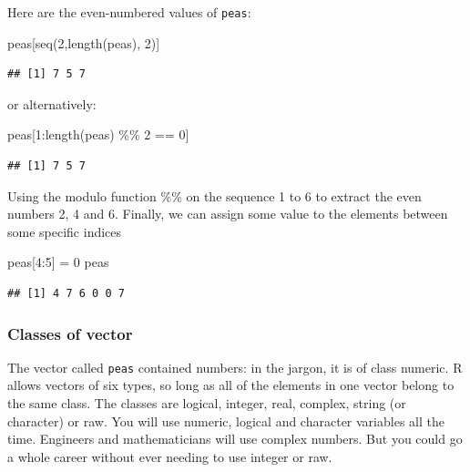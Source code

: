 \documentclass[
]{book}
\newenvironment{Shaded}{\begin{snugshade}}{\end{snugshade}}
\newcommand{\DecValTok}[1]{\textcolor[rgb]{0.00,0.00,0.81}{#1}}
\newcommand{\FunctionTok}[1]{\textcolor[rgb]{0.00,0.00,0.00}{#1}}
\newcommand{\NormalTok}[1]{#1}
\newcommand{\OtherTok}[1]{\textcolor[rgb]{0.56,0.35,0.01}{#1}}
\newcommand{\SpecialCharTok}[1]{\textcolor[rgb]{0.00,0.00,0.00}{#1}}
\theoremstyle{definition}
\theoremstyle{definition}
\theoremstyle{definition}
\theoremstyle{definition}
\theoremstyle{remark}
\begin{document}
Here are the even-numbered values of \texttt{peas}:

\begin{Shaded}
\begin{Highlighting}[]
\NormalTok{peas[}\FunctionTok{seq}\NormalTok{(}\DecValTok{2}\NormalTok{,}\FunctionTok{length}\NormalTok{(peas), }\DecValTok{2}\NormalTok{)]}
\end{Highlighting}
\end{Shaded}

\begin{verbatim}
## [1] 7 5 7
\end{verbatim}

or alternatively:

\begin{Shaded}
\begin{Highlighting}[]
\NormalTok{peas[}\DecValTok{1}\SpecialCharTok{:}\FunctionTok{length}\NormalTok{(peas) }\SpecialCharTok{\%\%} \DecValTok{2} \SpecialCharTok{==} \DecValTok{0}\NormalTok{]}
\end{Highlighting}
\end{Shaded}

\begin{verbatim}
## [1] 7 5 7
\end{verbatim}

Using the modulo function \%\% on the sequence 1 to 6 to extract the even numbers 2, 4 and 6. Finally, we can assign some value to the elements between some specific indices

\begin{Shaded}
\begin{Highlighting}[]
\NormalTok{peas[}\DecValTok{4}\SpecialCharTok{:}\DecValTok{5}\NormalTok{] }\OtherTok{=} \DecValTok{0}
\NormalTok{peas}
\end{Highlighting}
\end{Shaded}

\begin{verbatim}
## [1] 4 7 6 0 0 7
\end{verbatim}

\hypertarget{classes-of-vector}{%
\subsubsection{Classes of vector}\label{classes-of-vector}}

The vector called \texttt{peas} contained numbers: in the jargon, it is of class numeric. R allows vectors of six types, so long as all of the elements in one vector belong to the same class. The classes are logical, integer, real, complex, string (or character) or raw. You will use numeric, logical and character variables all the time. Engineers and mathematicians will use complex numbers. But you could go a whole career without ever needing to use integer or raw.
\end{document}
